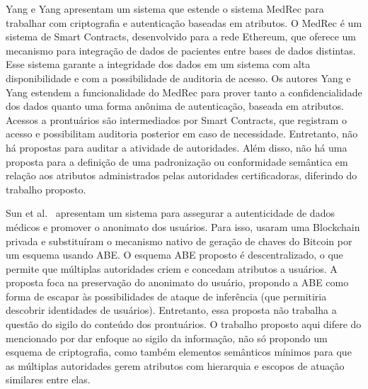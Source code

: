 \documentclass[a4paper,11pt]{article}
\begin{document}
Yang e Yang \cite{Yang2017} apresentam um sistema que estende o sistema MedRec para trabalhar com criptografia e autenticação baseadas em atributos.
O MedRec \cite{Azaria2016} é um sistema de Smart Contracts, desenvolvido para a rede Ethereum, que oferece um mecanismo para integração de dados de pacientes entre bases de dados distintas.
Esse sistema garante a integridade dos dados em um sistema com alta disponibilidade e com a possibilidade de auditoria de acesso.
Os autores Yang e Yang estendem a funcionalidade do MedRec para prover tanto a confidencialidade dos dados quanto uma forma anônima de autenticação, baseada em atributos. %
Acessos a prontuários são intermediados por Smart Contracts, que registram o acesso e possibilitam auditoria posterior em caso de necessidade. Entretanto, não há propostas para auditar a atividade de autoridades.
Além disso, não há uma proposta para a definição de uma padronização ou conformidade semântica em relação aos atributos administrados pelas autoridades certificadoras, diferindo do trabalho proposto.


Sun et al.~\cite{Sun2018} apresentam um sistema para assegurar a autenticidade de dados médicos e promover o anonimato dos usuários.
Para isso, usaram uma Blockchain privada e substituíram o mecanismo nativo de geração de chaves do Bitcoin por um esquema usando ABE. O esquema ABE proposto é descentralizado, o que permite que múltiplas autoridades criem e concedam atributos a usuários.
A proposta foca na preservação do anonimato do usuário, propondo a ABE como forma de escapar às possibilidades de ataque de inferência (que permitiria  descobrir identidades de usuários). Entretanto, essa proposta não trabalha a questão do sigilo do conteúdo dos prontuários.
O trabalho proposto aqui difere do mencionado por dar enfoque ao sigilo da informação, não só propondo um esquema de criptografia, como também elementos semânticos mínimos para que as múltiplas autoridades gerem atributos com hierarquia e escopos de atuação similares entre elas.
\end{document}
